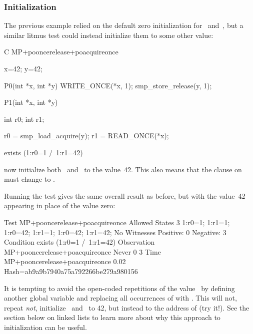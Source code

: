 \subsubsection{Initialization}

The previous example relied on the default zero initialization for~
and~, but a similar litmus test could instead initialize them
to some other value:

\begin{fcvlabel}
\begin{VerbatimN}[commandchars=\%\@\$]
	C MP+pooncerelease+poacquireonce

	{               %
		x=42;
		y=42;
	}               %

	P0(int *x, int *y)
	{
		WRITE_ONCE(*x, 1);
		smp_store_release(y, 1);
	}

	P1(int *x, int *y)
	{
		int r0;
		int r1;

		r0 = smp_load_acquire(y);
		r1 = READ_ONCE(*x);
	}

	exists (1:r0=1 /\ 1:r1=42)   %
\end{VerbatimN}
\end{fcvlabel}

\begin{fcvref}
 now initialize both~ and~ to
the value~42.
This also means that the  clause on  must change
 to .
\end{fcvref}

Running the test gives the same overall result as before, but with the
value~42 appearing in place of the value zero:

\begin{VerbatimN}
	Test MP+pooncerelease+poacquireonce Allowed
	States 3
	1:r0=1; 1:r1=1;
	1:r0=42; 1:r1=1;
	1:r0=42; 1:r1=42;
	No
	Witnesses
	Positive: 0 Negative: 3
	Condition exists (1:r0=1 /\ 1:r1=42)
	Observation MP+pooncerelease+poacquireonce Never 0 3
	Time MP+pooncerelease+poacquireonce 0.02
	Hash=ab9a9b7940a75a792266be279a980156
\end{VerbatimN}

It is tempting to avoid the open-coded repetitions of the value~
by defining another global variable  and replacing all
occurrences of  with .
This will not, repeat \emph{not}, initialize~ and~ to 42,
but instead to the address of  (try it!).
See the section below on linked lists to learn more about why this approach
to initialization can be useful.



